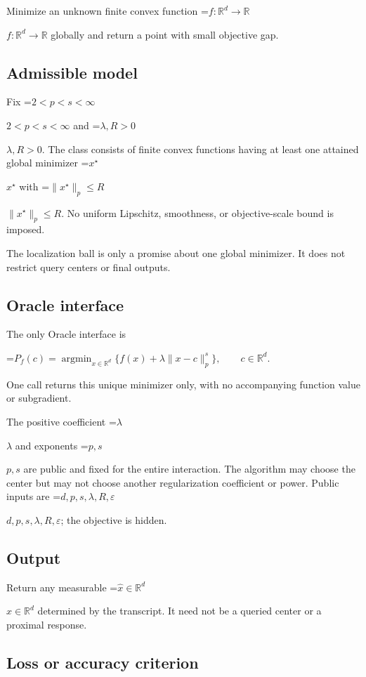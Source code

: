 \documentclass[10pt,a4paper]{article}
\newcommand{\AtlasMath}[1]{\par\begingroup\centering\setbox0=\hbox{$\displaystyle #1$}\ifdim\wd0>1.4\linewidth\typeout{ATLAS WIDE FORMULA: \the\wd0}\fi\ifdim\wd0>\linewidth\resizebox{\linewidth}{!}{\box0}\else\box0\fi\par\endgroup}
\newcommand{\AtlasInlineMath}[1]{\begingroup\setbox0=\hbox{$#1$}\ifdim\wd0>.4\linewidth\endgroup\AtlasMath{#1}\else\endgroup$#1$\fi}
\begin{document}
Minimize an unknown finite convex function \AtlasInlineMath{f:\mathbb R^d\to\mathbb R} globally and return a point with small objective gap.



\subsection{Admissible model}


Fix \AtlasInlineMath{2<p<s<\infty} and \AtlasInlineMath{\lambda,R>0}. The class consists of finite convex functions having at least one attained global minimizer \AtlasInlineMath{x^\star} with \AtlasInlineMath{\|x^\star\|_p\le R}. No uniform Lipschitz, smoothness, or objective-scale bound is imposed.



The localization ball is only a promise about one global minimizer. It does not restrict query centers or final outputs.



\subsection{Oracle interface}


The only Oracle interface is
\AtlasMath{P_f(c)=\operatorname*{argmin}_{x\in\mathbb R^d}\{f(x)+\lambda\|x-c\|_p^s\},\qquad c\in\mathbb R^d.}
 One call returns this unique minimizer only, with no accompanying function value or subgradient.



The positive coefficient \AtlasInlineMath{\lambda} and exponents \AtlasInlineMath{p,s} are public and fixed for the entire interaction. The algorithm may choose the center but may not choose another regularization coefficient or power. Public inputs are \AtlasInlineMath{d,p,s,\lambda,R,\varepsilon}; the objective is hidden.



\subsection{Output}


Return any measurable \AtlasInlineMath{\widehat x\in\mathbb R^d} determined by the transcript. It need not be a queried center or a proximal response.



\subsection{Loss or accuracy criterion}
\end{document}
